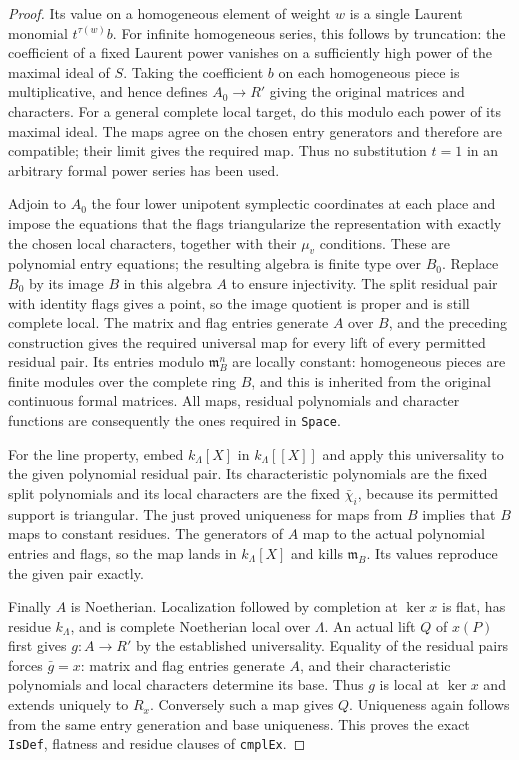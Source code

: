 \begin{proof}
Its value on a homogeneous element of weight $w$
is a single Laurent monomial $t^{\tau(w)}b$.
For infinite homogeneous series, this follows
by truncation: the coefficient of a fixed
Laurent power vanishes on a sufficiently high
power of the maximal ideal of $S$.
Taking the coefficient $b$ on each homogeneous
piece is multiplicative, and hence defines
$A_0\to R'$ giving the original matrices and
characters.  For a general complete local
target, do this modulo each power of its
maximal ideal.  The maps agree on the chosen
entry generators and therefore are compatible;
their limit gives the required map.  Thus
no substitution $t=1$ in an arbitrary formal
power series has been used.

Adjoin to $A_0$ the four lower unipotent
symplectic coordinates at each place and impose
the equations that the flags triangularize
the representation with exactly the chosen
local characters, together with their $\mu_v$
conditions.  These are polynomial entry
equations; the resulting algebra is finite
type over $B_0$.  Replace $B_0$ by its image
$B$ in this algebra $A$ to ensure injectivity.
The split residual pair with identity flags
gives a point, so the image quotient is
proper and is still complete local.  The
matrix and flag entries generate $A$ over
$B$, and the preceding construction gives
the required universal map for every lift
of every permitted residual pair.  Its
entries modulo $\mathfrak m_B^n$ are locally
constant: homogeneous pieces are finite
modules over the complete ring $B$, and
this is inherited from the original
continuous formal matrices.  All maps,
residual polynomials and character functions
are consequently the ones required in
\texttt{Space}.

For the line property, embed $k_\Lambda[X]$
in $k_\Lambda[[X]]$ and apply this universality
to the given polynomial residual pair.  Its
characteristic polynomials are the fixed
split polynomials and its local characters
are the fixed $\bar\chi_i$, because its
permitted support is triangular.  The just
proved uniqueness for maps from $B$ implies
that $B$ maps to constant residues.  The
generators of $A$ map to the actual
polynomial entries and flags, so the map
lands in $k_\Lambda[X]$ and kills
$\mathfrak m_B$.  Its values reproduce
the given pair exactly.

Finally $A$ is Noetherian.  Localization
followed by completion at $\ker x$ is flat,
has residue $k_\Lambda$, and is complete
Noetherian local over $\Lambda$.  An actual
lift $Q$ of $x(P)$ first gives $g:A\to R'$
by the established universality.  Equality
of the residual pairs forces
$\bar g=x$: matrix and flag entries generate
$A$, and their characteristic polynomials
and local characters determine its base.
Thus $g$ is local at $\ker x$ and extends
uniquely to $R_x$.  Conversely such a map
gives $Q$.  Uniqueness again follows from
the same entry generation and base
uniqueness.  This proves the exact
\texttt{IsDef}, flatness and residue clauses
of \texttt{cmplEx}.
\end{proof}

